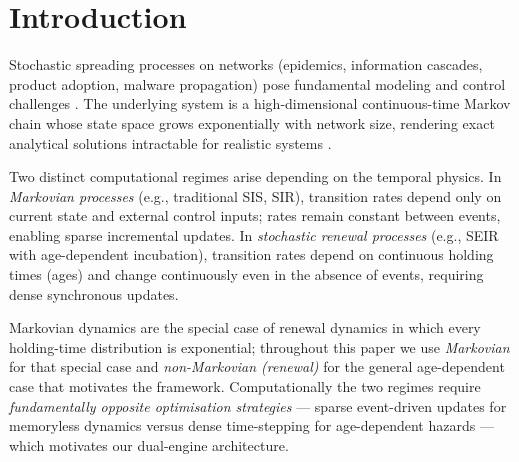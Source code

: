 \section{Introduction}\label{sec:introduction}

Stochastic spreading processes on networks (epidemics, information cascades, product adoption, malware propagation) pose fundamental modeling and control challenges \citep{pastor2015epidemic, kiss2017mathematics, barrat2008dynamical}. The underlying system is a high-dimensional continuous-time Markov chain whose state space grows exponentially with network size, rendering exact analytical solutions intractable for realistic systems \citep{anderson1991infectious, keeling2008modeling}.

Two distinct computational regimes arise depending on the temporal physics. In \emph{Markovian processes} (e.g., traditional SIS, SIR), transition rates depend only on current state and external control inputs; rates remain constant between events, enabling sparse incremental updates. In \emph{stochastic renewal processes} (e.g., SEIR with age-dependent incubation), transition rates depend on continuous holding times (ages) and change continuously even in the absence of events, requiring dense synchronous updates.

Markovian dynamics are the special case of renewal dynamics in which every holding-time distribution is exponential; throughout this paper we use \emph{Markovian} for that special case and \emph{non-Markovian (renewal)} for the general age-dependent case that motivates the framework. Computationally the two regimes require \emph{fundamentally opposite optimisation strategies} --- sparse event-driven updates for memoryless dynamics versus dense time-stepping for age-dependent hazards --- which motivates our dual-engine architecture.

